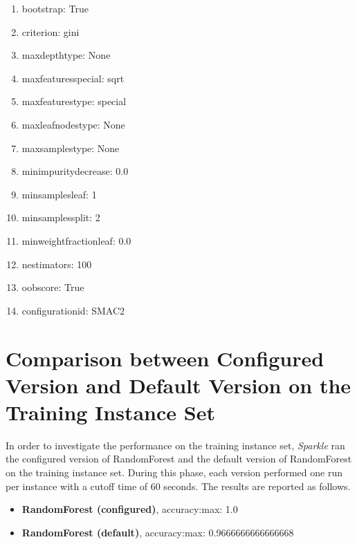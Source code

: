 \documentclass[british]{article}
\begin{document}
\begin{enumerate}
\item bootstrap: True
\item criterion: gini
\item max\textunderscore depth\textunderscore type: None
\item max\textunderscore features\textunderscore special: sqrt
\item max\textunderscore features\textunderscore type: special
\item max\textunderscore leaf\textunderscore nodes\textunderscore type: None
\item max\textunderscore samples\textunderscore type: None
\item min\textunderscore impurity\textunderscore decrease: 0.0
\item min\textunderscore samples\textunderscore leaf: 1
\item min\textunderscore samples\textunderscore split: 2
\item min\textunderscore weight\textunderscore fraction\textunderscore leaf: 0.0
\item n\textunderscore estimators: 100
\item oob\textunderscore score: True
\item configuration\textunderscore id: SMAC2

\end{enumerate}

\vspace{5mm}


\section{Comparison between Configured Version and Default Version on the Training Instance Set}
In order to investigate the performance on the training instance set, \emph{Sparkle} ran the configured version of RandomForest and the default version of RandomForest on the training instance set. During this phase, each version performed one run per instance with a cutoff time of 60 seconds. The results are reported as follows.

\begin{itemize}
    \item \textbf{RandomForest (configured)}, accuracy:max: 1.0
    \item \textbf{RandomForest (default)}, accuracy:max: 0.9666666666666668
\end{itemize}
\end{document}
